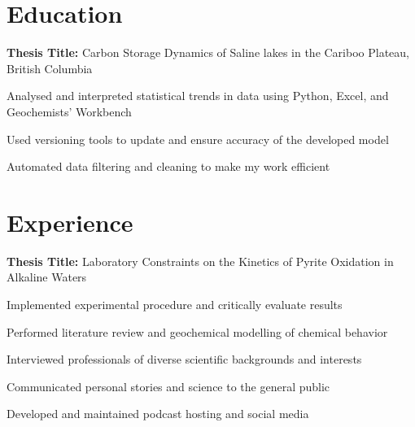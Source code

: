 \documentclass[]{deedy-resume-openfont}
\begin{document}
    
%
%
%
%
\section{Education}
\textbf{Thesis Title:} Carbon Storage Dynamics of Saline lakes in the Cariboo Plateau, British Columbia

\begin{tightemize}
\item Analysed and interpreted statistical trends in data using Python, Excel, and Geochemists’ Workbench
\item Used versioning tools to update and ensure accuracy of the developed model
\item Automated data filtering and cleaning to make my work efficient
\end{tightemize}
\sectionsep
%
%
\section{Experience}
\textbf{Thesis Title:} Laboratory Constraints on the Kinetics of Pyrite Oxidation in Alkaline Waters
\begin{tightemize}
\item Implemented experimental procedure and critically evaluate results
\item Performed literature review and geochemical modelling of chemical behavior 
\end{tightemize}


\sectionsep

\begin{tightemize}
\item Interviewed professionals of diverse scientific backgrounds and interests
\item Communicated personal stories and science to the general public 
\item Developed and maintained podcast hosting and social media
\end{tightemize}
\sectionsep
\end{document}
